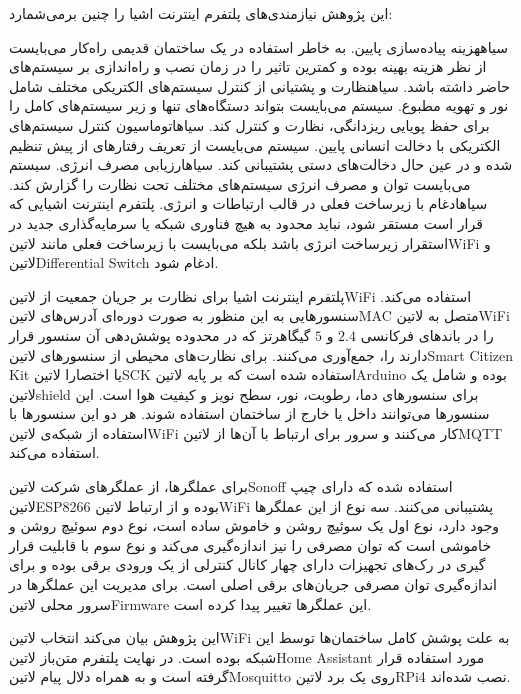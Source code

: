 این پژوهش نیازمندی‌های پلتفرم اینترنت اشیا را چنین برمی‌شمارد:

 ‌سیاه{هزینه پیاده‌سازی پایین}. به خاطر استفاده در یک ساختمان قدیمی راه‌کار می‌بایست از نظر هزینه بهینه بوده و کمترین تاثیر را در زمان نصب و راه‌اندازی
بر سیستم‌های حاضر داشته باشد.
 ‌سیاه{نظارت و پشتیانی از کنترل سیستم‌های الکتریکی مختلف شامل نور و تهویه مطبوع}. سیستم می‌بایست بتواند دستگاه‌های تنها
و زیر سیستم‌های کامل را برای حفظ پویایی ریزدانگی، نظارت و کنترل کند.
 ‌سیاه{اتوماسیون کنترل سیستم‌های الکتریکی با دخالت انسانی پایین}. سیستم می‌بایست از تعریف رفتارهای از پیش تنظیم شده و در عین حال دخالت‌های دستی
پشتیبانی کند.
 ‌سیاه{ارزیابی مصرف انرژی}. سیستم می‌بایست توان و مصرف انرژی سیستم‌های مختلف تحت نظارت را گزارش کند.
 ‌سیاه{ادغام با زیرساخت فعلی در قالب ارتباطات و انرژی}. پلتفرم اینترنت اشیایی که قرار است مستقر شود، نباید محدود به هیچ فناوری شبکه یا سرمایه‌گذاری
جدید در استقرار زیرساخت انرژی باشد بلکه می‌بایست با زیرساخت فعلی مانند ‌لاتین{WiFi} و ‌لاتین{Differential Switch} ادغام شود.

پلتفرم اینترنت اشیا برای نظارت بر جریان جمعیت از ‌لاتین{WiFi} استفاده می‌کند. سنسورهایی به این منظور به صورت دوره‌ای آدرس‌های ‌لاتین{MAC} متصل به
‌لاتین{WiFi} را در باندهای فرکانسی $2.4$ و $5$ گیگاهرتز که در محدوده پوشش‌دهی آن سنسور قرار دارند را، جمع‌آوری می‌کنند.
برای نظارت‌های محیطی از سنسورهای ‌لاتین{Smart Citizen Kit} یا اختصارا ‌لاتین{SCK} استفاده شده است که بر پایه ‌لاتین{Arduino} بوده
و شامل یک ‌لاتین{shield} برای سنسورهای دما، رطوبت، نور، سطح نویز و کیفیت هوا است. این سنسورها می‌توانند داخل یا خارج از ساختمان استفاده شوند.
هر دو این سنسورها با استفاده از شبکه‌ی ‌لاتین{WiFi} کار می‌کنند و سرور برای ارتباط با آن‌ها از ‌لاتین{MQTT} استفاده می‌کند.

برای عملگرها، از عملگرهای شرکت ‌لاتین{Sonoff} استفاده شده که دارای چیپ ‌لاتین{ESP8266} بوده و از ارتباط ‌لاتین{WiFi} پشتیبانی می‌کنند.
سه نوع از این عملگرها وجود دارد، نوع اول یک سوئیچ روشن و خاموش ساده است، نوع دوم سوئیچ روشن و خاموشی است که توان مصرفی را نیز اندازه‌گیری می‌کند و
نوع سوم با قابلیت قرار گیری در رک‌های تجهیزات دارای چهار کانال کنترلی از یک ورودی برقی بوده و برای اندازه‌گیری توان مصرفی جریان‌های برقی اصلی است.
برای مدیریت این عملگرها در سرور محلی ‌لاتین{Firmware} این عملگرها تغییر پیدا کرده است.

این پژوهش بیان می‌کند انتخاب ‌لاتین{WiFi} به علت پوشش کامل ساختمان‌ها توسط این شبکه بوده است.
در نهایت پلتفرم متن‌باز ‌لاتین{Home Assistant} مورد استفاده قرار گرفته است و به همراه دلال پیام ‌لاتین{Mosquitto} روی یک برد ‌لاتین{RPi4}
نصب شده‌اند.

